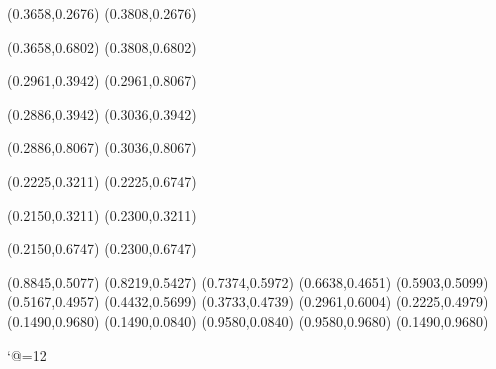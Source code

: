\PST@Solid(0.3658,0.2676)
(0.3808,0.2676)

\PST@Solid(0.3658,0.6802)
(0.3808,0.6802)

\PST@Solid(0.2961,0.3942)
(0.2961,0.8067)

\PST@Solid(0.2886,0.3942)
(0.3036,0.3942)

\PST@Solid(0.2886,0.8067)
(0.3036,0.8067)

\PST@Solid(0.2225,0.3211)
(0.2225,0.6747)

\PST@Solid(0.2150,0.3211)
(0.2300,0.3211)

\PST@Solid(0.2150,0.6747)
(0.2300,0.6747)

\PST@Diamond(0.8845,0.5077)
\PST@Diamond(0.8219,0.5427)
\PST@Diamond(0.7374,0.5972)
\PST@Diamond(0.6638,0.4651)
\PST@Diamond(0.5903,0.5099)
\PST@Diamond(0.5167,0.4957)
\PST@Diamond(0.4432,0.5699)
\PST@Diamond(0.3733,0.4739)
\PST@Diamond(0.2961,0.6004)
\PST@Diamond(0.2225,0.4979)
\PST@Border(0.1490,0.9680)
(0.1490,0.0840)
(0.9580,0.0840)
(0.9580,0.9680)
(0.1490,0.9680)

\catcode`@=12
\fi
\endpspicture
